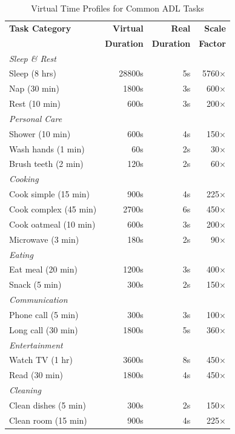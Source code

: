 \documentclass[conference]{IEEEtran}
\begin{document}
\begin{table}[t]
\centering
\caption{Virtual Time Profiles for Common ADL Tasks}
\label{tab:time_profiles}
\begin{tabular}{@{}lrrr@{}}
\toprule
\textbf{Task Category} & \textbf{Virtual} & \textbf{Real} & \textbf{Scale} \\
& \textbf{Duration} & \textbf{Duration} & \textbf{Factor} \\
\midrule
\multicolumn{4}{l}{\textit{Sleep \& Rest}} \\
Sleep (8 hrs) & 28800s & 5s & 5760$\times$ \\
Nap (30 min) & 1800s & 3s & 600$\times$ \\
Rest (10 min) & 600s & 3s & 200$\times$ \\
\midrule
\multicolumn{4}{l}{\textit{Personal Care}} \\
Shower (10 min) & 600s & 4s & 150$\times$ \\
Wash hands (1 min) & 60s & 2s & 30$\times$ \\
Brush teeth (2 min) & 120s & 2s & 60$\times$ \\
\midrule
\multicolumn{4}{l}{\textit{Cooking}} \\
Cook simple (15 min) & 900s & 4s & 225$\times$ \\
Cook complex (45 min) & 2700s & 6s & 450$\times$ \\
Cook oatmeal (10 min) & 600s & 3s & 200$\times$ \\
Microwave (3 min) & 180s & 2s & 90$\times$ \\
\midrule
\multicolumn{4}{l}{\textit{Eating}} \\
Eat meal (20 min) & 1200s & 3s & 400$\times$ \\
Snack (5 min) & 300s & 2s & 150$\times$ \\
\midrule
\multicolumn{4}{l}{\textit{Communication}} \\
Phone call (5 min) & 300s & 3s & 100$\times$ \\
Long call (30 min) & 1800s & 5s & 360$\times$ \\
\midrule
\multicolumn{4}{l}{\textit{Entertainment}} \\
Watch TV (1 hr) & 3600s & 8s & 450$\times$ \\
Read (30 min) & 1800s & 4s & 450$\times$ \\
\midrule
\multicolumn{4}{l}{\textit{Cleaning}} \\
Clean dishes (5 min) & 300s & 2s & 150$\times$ \\
Clean room (15 min) & 900s & 4s & 225$\times$ \\
\bottomrule
\end{tabular}
\end{table}
\end{document}
